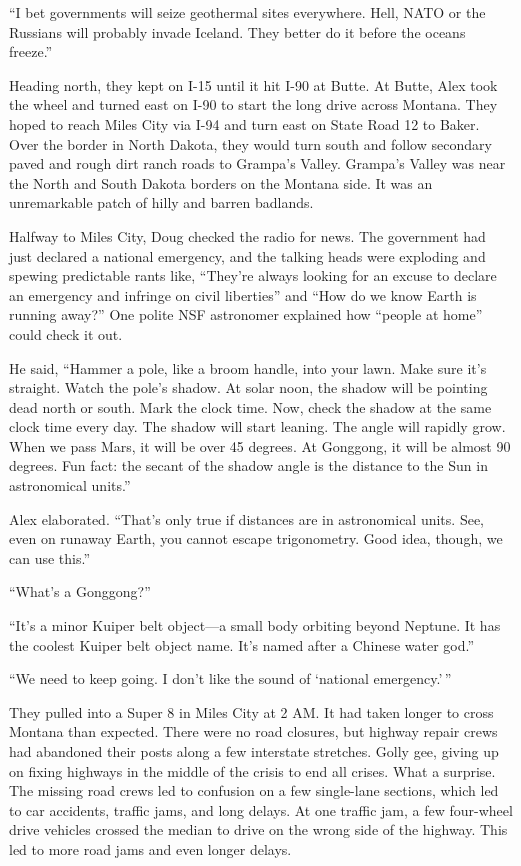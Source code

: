 ``I bet governments will seize geothermal sites everywhere. Hell, NATO
or the Russians will probably invade Iceland. They better do it before
the oceans freeze.''

Heading north, they kept on I-15 until it hit I-90 at Butte. At Butte,
Alex took the wheel and turned east on I-90 to start the long drive
across Montana. They hoped to reach Miles City via I-94 and turn east on
State Road 12 to Baker. Over the border in North Dakota, they would turn
south and follow secondary paved and rough dirt ranch roads to Grampa's
Valley. Grampa's Valley was near the North and South Dakota borders on
the Montana side. It was an unremarkable patch of hilly and barren
badlands.

Halfway to Miles City, Doug checked the radio for news. The government
had just declared a national emergency, and the talking heads were
exploding and spewing predictable rants like, ``They're always looking
for an excuse to declare an emergency and infringe on civil liberties''
and ``How do we know Earth is running away?'' One polite NSF astronomer
explained how ``people at home'' could check it out.

He said, ``Hammer a pole, like a broom handle, into your lawn. Make sure
it's straight. Watch the pole's shadow. At solar noon, the shadow will
be pointing dead north or south. Mark the clock time. Now, check the
shadow at the same clock time every day. The shadow will start leaning.
The angle will rapidly grow. When we pass Mars, it will be over 45
degrees. At Gonggong, it will be almost 90 degrees. Fun fact: the secant
of the shadow angle is the distance to the Sun in astronomical units.''

Alex elaborated. ``That's only true if distances are in astronomical
units. See, even on runaway Earth, you cannot escape trigonometry. Good
idea, though, we can use this.''

``What's a Gonggong?''

``It's a minor Kuiper belt object---a small body orbiting beyond
Neptune. It has the coolest Kuiper belt object name. It's named after a
Chinese water god.''

``We need to keep going. I don't like the sound of `national
emergency.'\,''

They pulled into a Super 8 in Miles City at 2 AM. It had taken longer to
cross Montana than expected. There were no road closures, but highway
repair crews had abandoned their posts along a few interstate stretches.
Golly gee, giving up on fixing highways in the middle of the crisis to
end all crises. What a surprise. The missing road crews led to confusion
on a few single-lane sections, which led to car accidents, traffic jams,
and long delays. At one traffic jam, a few four-wheel drive vehicles
crossed the median to drive on the wrong side of the highway. This led
to more road jams and even longer delays.

